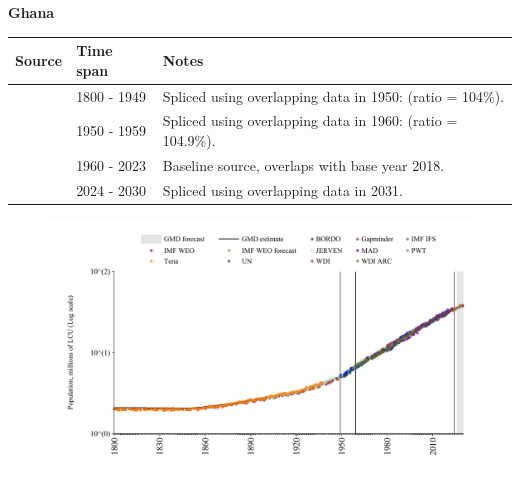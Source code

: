 \documentclass[12pt,a4paper,landscape]{article}
\begin{document}
\begin{adjustbox}{max totalsize={\paperwidth}{\paperheight},center}
\begin{minipage}[t][\textheight][t]{\textwidth}
\vspace*{0.5cm}
{}
\begin{center}
{\Large\bfseries Ghana}
\end{center}
\vspace{0.5cm}
\begin{table}[H]
\centering
\small
\begin{tabular}{|l|l|l|}
\hline
\textbf{Source} & \textbf{Time span} & \textbf{Notes} \\
\hline
\rowcolor{white}\cite{Gapminder}& 1800 - 1949 &Spliced using overlapping data in 1950: (ratio = 104\%).\\
\rowcolor{lightgray}\cite{IMF_IFS}& 1950 - 1959 &Spliced using overlapping data in 1960: (ratio = 104.9\%).\\
\rowcolor{white}\cite{WDI}& 1960 - 2023 &Baseline source, overlaps with base year 2018.\\
\rowcolor{lightgray}\cite{Gapminder}& 2024 - 2030 &Spliced using overlapping data in 2031.\\
\hline
\end{tabular}
\end{table}
\begin{figure}[H]
\centering
\includegraphics[width=\textwidth,height=0.6\textheight,keepaspectratio]{graphs/GHA_pop.pdf}
\end{figure}
\end{minipage}
\end{adjustbox}
\end{document}
